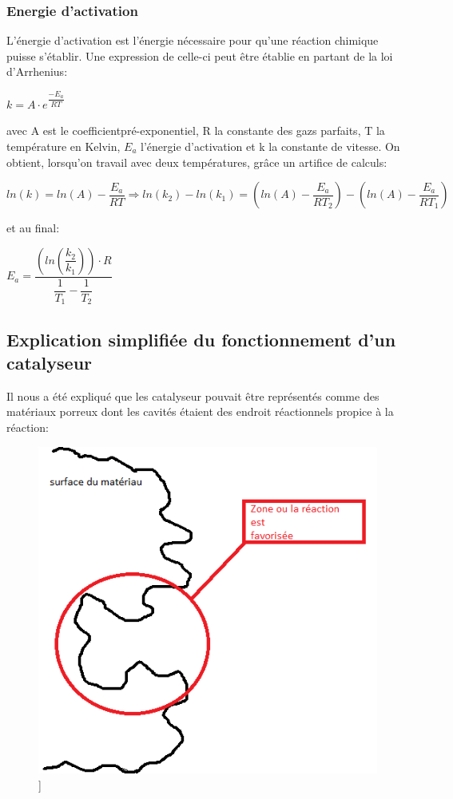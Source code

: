 \subsubsection*{Energie d'activation}
L'énergie d'activation est l'énergie nécessaire pour qu'une réaction chimique puisse s'établir. Une expression de celle-ci peut être établie en partant de la loi d'Arrhenius:

$k=A\cdot e^{\dfrac{-E_a}{RT}}$

avec A est le coefficientpré-exponentiel, R la constante des gazs parfaits, T la température en Kelvin, $E_a$ l'énergie d'activation et k la constante de vitesse.
On obtient, lorsqu'on travail avec deux températures, grâce un artifice de calculs:

$ln(k)=ln(A)-\dfrac{E_a}{RT} \Rightarrow ln(k_2)-ln(k_1)=\left( ln(A) - \dfrac{E_a}{RT_2} \right) - \left( ln(A) - \dfrac{E_a}{RT_1} \right)$

et au final:

$E_a = \dfrac{\left( ln(\dfrac{k_2}{k_1}) \right) \cdot R}{\dfrac{1}{T_1} - \dfrac{1}{T_2}}$

\subsection*{Explication simplifiée du fonctionnement d'un catalyseur}
Il nous a été expliqué que les catalyseur pouvait être représentés comme des matériaux porreux dont les cavités étaient des endroit réactionnels propice à la réaction:

\begin{figure} [h]
\begin{center}
\includegraphics[scale=0.5]{cata}]
\end{center}
\end{figure}

